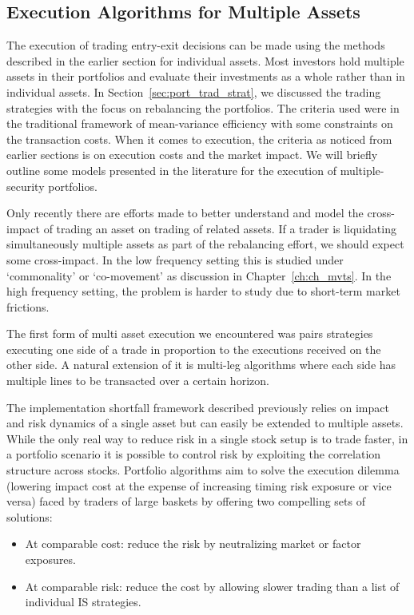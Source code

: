 \subsection{Execution Algorithms for Multiple Assets}

The execution of trading entry-exit decisions can be made using the methods described in the earlier section for individual assets. Most investors hold multiple assets in their portfolios and evaluate their investments as a whole rather than in individual assets. In Section~\ref{sec:port_trad_strat}, we discussed the trading strategies with the focus on rebalancing the portfolios. The criteria used were in the traditional framework of mean-variance efficiency with some constraints on the transaction costs. When it comes to execution, the criteria as noticed from earlier sections is on execution costs and the market impact. We will briefly outline some models presented in the literature for the execution of multiple-security portfolios.


Only recently there are efforts made to better understand and model the cross-impact of trading an asset on trading of related assets. If a trader is liquidating simultaneously multiple assets as part of the rebalancing effort, we should expect some cross-impact. In the low frequency setting this is studied under `commonality' or `co-movement' as discussion in Chapter~\ref{ch:ch_mvts}. In the high frequency setting, the problem is harder to study due to short-term market frictions.


The first form of multi asset execution we encountered was pairs strategies executing one side of a trade in proportion to the executions received on the other side. A natural extension of it is multi-leg algorithms where each side has multiple lines to be transacted over a certain horizon.


The implementation shortfall framework described previously relies on impact and risk dynamics of a single asset but can easily be extended to multiple assets. While the only real way to reduce risk in a single stock setup is to trade faster, in a portfolio scenario it is possible to control risk by exploiting the correlation structure across stocks. Portfolio algorithms aim to solve the execution dilemma (lowering impact cost at the expense of increasing timing risk exposure or vice versa) faced by traders of large baskets by offering two compelling sets of solutions:

        \begin{itemize}
        \item At comparable cost: reduce the risk by neutralizing market or factor exposures. 
        \item At comparable risk: reduce the cost by allowing slower trading than a list of individual IS strategies.
        \end{itemize}


